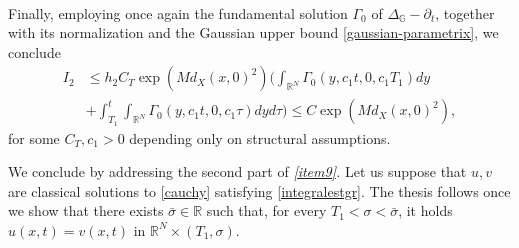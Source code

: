 \documentclass[11pt,a4paper]{article}
\numberwithin{equation}{section}
\newcommand{\R}{\mathbb{R}}
\def \rn {{\mathbb {R}}^{N}}
\def \s {\sigma}
\def \GG {{\mathbb{G}}}
\def \p {\partial}
\def \G {{\Gamma}}
\def \t {{\tau}}
\begin{document}
\begin{pf-fundamental}
\begin{equation}
\begin{aligned}
		\end{aligned}
	\end{equation}
	Finally, employing once again the fundamental solution $\G_0$ of $\Delta_\GG-\p_t$, together with its normalization and the Gaussian upper bound \eqref{gaussian-parametrix}, we conclude
	\begin{equation}
		\begin{aligned}
			I_2&\leq h_2C_T\exp\left({Md_X(x,0)^2}\right)\Bigg(\int_{\rn}\G_0(y,c_1t,0,c_1T_1)dy \\
			&+\int_{T_1}^t\int_{\rn}\G_0(y,c_1t,0,c_1\t)dy d\t\Bigg) \leq C\exp\left({Md_X(x,0)^2}\right),
		\end{aligned}
	\end{equation}
	for some $C_T,c_1>0$ depending only on structural assumptions. 
		
		
	We conclude by addressing the second part of \emph{\ref{item9}.} Let us suppose that $u,v$ are classical solutions to \eqref{cauchy} satisfying \eqref{integralestgr}. The thesis follows once we show that there exists $\bar\s\in\R$ such that, for every $T_1<\s<\bar \s$, it holds $u(x,t)=v(x,t)$ in $\rn\times(T_1,\s)$.
		

\end{pf-fundamental}
\end{document}

